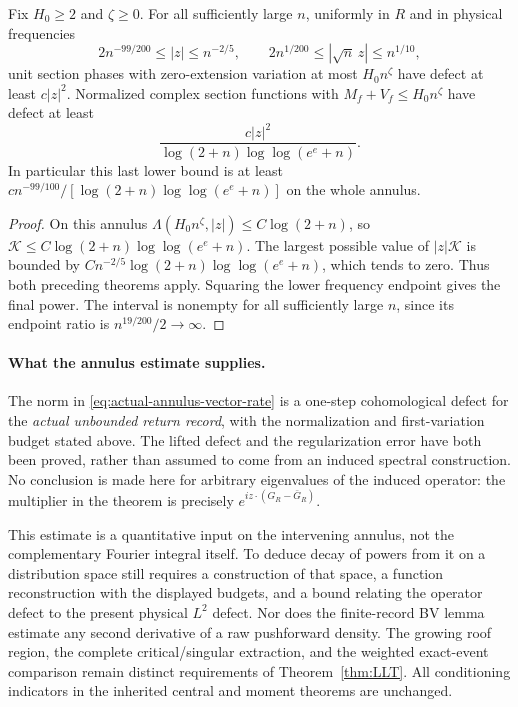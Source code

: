 \begin{corollary}
\label{cor:actual-annulus-defect}
Fix $H_0\ge2$ and $\zeta\ge0$. For all sufficiently large $n$,
uniformly in $R$ and in physical frequencies
\begin{equation}\label{eq:actual-annulus-frequencies}
 2n^{-99/200}\le|z|\le n^{-2/5},\qquad
        2n^{1/200}\le|\sqrt n\,z|\le n^{1/10},
\end{equation}
unit section phases with zero-extension variation at most $H_0n^\zeta$
have defect at least $c|z|^2$. Normalized complex section functions
with $M_f+V_f\le H_0n^\zeta$ have defect at least
\begin{equation}\label{eq:actual-annulus-vector-rate}
 \frac{c|z|^2}{\log(2+n)\log\log(e^e+n)}.
\end{equation}
In particular this last lower bound is at least
$c n^{-99/100}/[\log(2+n)\log\log(e^e+n)]$ on the whole annulus.
\end{corollary}
\begin{proof}
On this annulus $\Lambda(H_0n^\zeta,|z|)\le C\log(2+n)$, so
$\mathcal K\le C\log(2+n)\log\log(e^e+n)$.
The largest possible value of $|z|\mathcal K$ is bounded by
$C n^{-2/5}\log(2+n)\log\log(e^e+n)$, which tends to zero.
Thus both preceding theorems apply. Squaring the lower frequency
endpoint gives the final power. The interval is nonempty for all
sufficiently large $n$, since its endpoint ratio is
$n^{19/200}/2\to\infty$.
\end{proof}

\paragraph{What the annulus estimate supplies.}
The norm in \eqref{eq:actual-annulus-vector-rate} is a one-step
cohomological defect for the \emph{actual unbounded return record},
with the normalization and first-variation budget stated above.
The lifted defect and the regularization error have both been proved,
rather than assumed to come from an induced spectral construction.
No conclusion is made here for arbitrary eigenvalues of the induced
operator: the multiplier in the theorem is precisely
$e^{iz\cdot(G_R-\bar G_R)}$.

This estimate is a quantitative input on the intervening annulus, not
the complementary Fourier integral itself. To deduce decay of powers
from it on a distribution space still requires a construction of that
space, a function reconstruction with the displayed budgets, and a
bound relating the operator defect to the present physical $L^2$
defect. Nor does the finite-record BV lemma estimate any second
derivative of a raw pushforward density. The growing roof region,
the complete critical/singular extraction, and the weighted exact-event
comparison remain distinct requirements of Theorem~\ref{thm:LLT}.
All conditioning indicators in the inherited central and moment
theorems are unchanged.
